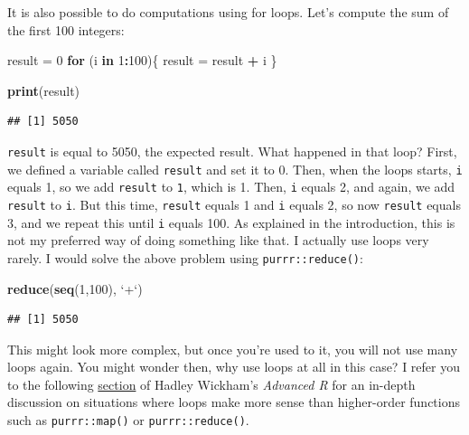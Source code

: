 \documentclass[]{gitbook}
\newenvironment{Shaded}{\begin{snugshade}}{\end{snugshade}}
\newcommand{\ControlFlowTok}[1]{\textcolor[rgb]{0.13,0.29,0.53}{\textbf{#1}}}
\newcommand{\DataTypeTok}[1]{\textcolor[rgb]{0.13,0.29,0.53}{#1}}
\newcommand{\DecValTok}[1]{\textcolor[rgb]{0.00,0.00,0.81}{#1}}
\newcommand{\KeywordTok}[1]{\textcolor[rgb]{0.13,0.29,0.53}{\textbf{#1}}}
\newcommand{\NormalTok}[1]{#1}
\newcommand{\OperatorTok}[1]{\textcolor[rgb]{0.81,0.36,0.00}{\textbf{#1}}}
\newcommand{\StringTok}[1]{\textcolor[rgb]{0.31,0.60,0.02}{#1}}
\begin{document}
It is also possible to do computations using for loops. Let's compute the sum of the first
100 integers:

\begin{Shaded}
\begin{Highlighting}[]
\NormalTok{result =}\StringTok{ }\DecValTok{0}
\ControlFlowTok{for}\NormalTok{ (i }\ControlFlowTok{in} \DecValTok{1}\OperatorTok{:}\DecValTok{100}\NormalTok{)\{}
\NormalTok{  result =}\StringTok{ }\NormalTok{result }\OperatorTok{+}\StringTok{ }\NormalTok{i}
\NormalTok{\}}

\KeywordTok{print}\NormalTok{(result)}
\end{Highlighting}
\end{Shaded}

\begin{verbatim}
## [1] 5050
\end{verbatim}

\texttt{result} is equal to 5050, the expected result. What happened in that loop? First, we defined a
variable called \texttt{result} and set it to 0. Then, when the loops starts, \texttt{i} equals 1, so we add
\texttt{result} to \texttt{1}, which is 1. Then, \texttt{i} equals 2, and again, we add \texttt{result} to \texttt{i}. But this time,
\texttt{result} equals 1 and \texttt{i} equals 2, so now \texttt{result} equals 3, and we repeat this until \texttt{i}
equals 100. As explained in the introduction, this is not my preferred way of doing something like
that. I actually use loops very rarely. I would solve the above problem using \texttt{purrr::reduce()}:

\begin{Shaded}
\begin{Highlighting}[]
\KeywordTok{reduce}\NormalTok{(}\KeywordTok{seq}\NormalTok{(}\DecValTok{1}\NormalTok{,}\DecValTok{100}\NormalTok{), }\StringTok{`}\DataTypeTok{+}\StringTok{`}\NormalTok{)}
\end{Highlighting}
\end{Shaded}

\begin{verbatim}
## [1] 5050
\end{verbatim}

This might look more complex, but once you're used to it, you will not use many loops again.
You might wonder then, why use loops at all in this case? I refer you to the following
\href{http://adv-r.had.co.nz/Functionals.html\#functionals-not}{section} of Hadley Wickham's \emph{Advanced R}
for an in-depth discussion on situations where loops make more sense than higher-order functions
such as \texttt{purrr::map()} or \texttt{purrr::reduce()}.
\end{document}
